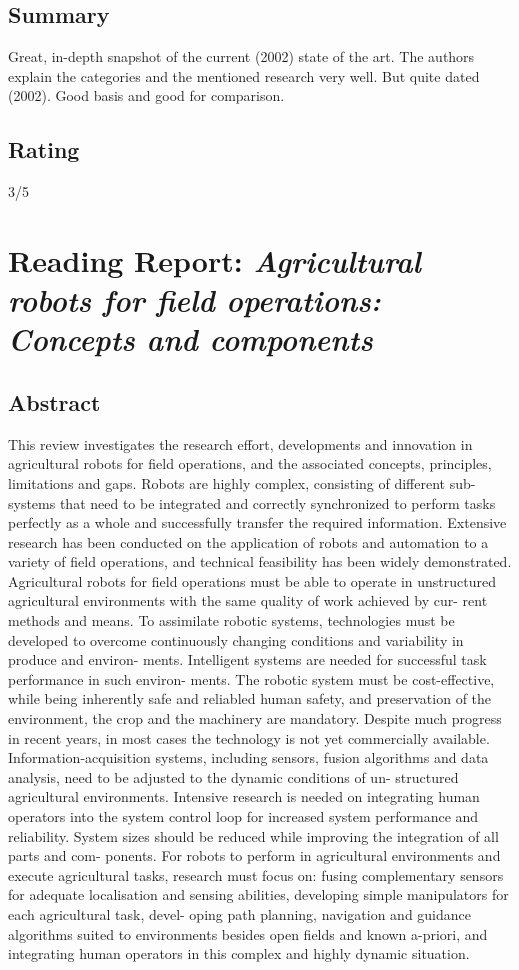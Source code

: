 \subsection*{Summary}
Great, in-depth snapshot of the current (2002) state of the art. The authors explain the categories and the mentioned research very well.
But quite dated (2002). Good basis and good for comparison.

\subsection*{Rating}
3/5


\section{Reading Report: \emph{Agricultural robots for field operations: Concepts and components}}
\cite{Bechar2016}

\subsection*{Abstract}

This review investigates the research effort, developments and innovation in agricultural
robots for field operations, and the associated concepts, principles, limitations and gaps.
Robots are highly complex, consisting of different sub-systems that need to be integrated
and correctly synchronized to perform tasks perfectly as a whole and successfully transfer
the required information. Extensive research has been conducted on the application of
robots and automation to a variety of field operations, and technical feasibility has been
widely demonstrated. Agricultural robots for field operations must be able to operate in
unstructured agricultural environments with the same quality of work achieved by cur-
rent methods and means. To assimilate robotic systems, technologies must be developed
to overcome continuously changing conditions and variability in produce and environ-
ments. Intelligent systems are needed for successful task performance in such environ-
ments. The robotic system must be cost-effective, while being inherently safe and
reliabled human safety, and preservation of the environment, the crop and the machinery
are mandatory. Despite much progress in recent years, in most cases the technology is not
yet commercially available. Information-acquisition systems, including sensors, fusion
algorithms and data analysis, need to be adjusted to the dynamic conditions of un-
structured agricultural environments. Intensive research is needed on integrating human
operators into the system control loop for increased system performance and reliability.
System sizes should be reduced while improving the integration of all parts and com-
ponents. For robots to perform in agricultural environments and execute agricultural
tasks, research must focus on: fusing complementary sensors for adequate localisation
and sensing abilities, developing simple manipulators for each agricultural task, devel-
oping path planning, navigation and guidance algorithms suited to environments besides
open fields and known a-priori, and integrating human operators in this complex and
highly dynamic situation.



